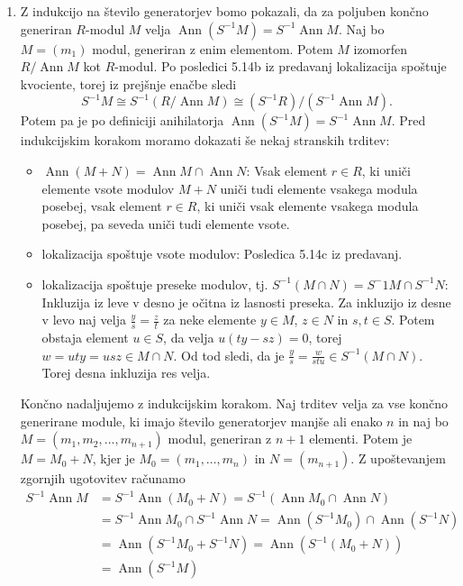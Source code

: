 \documentclass[a4paper, 12pt]{article}
\DeclareMathOperator{\Ann}{Ann}
\begin{document}
\begin{enumerate}[label=(\alph*)]
	\item Z indukcijo na število generatorjev bomo pokazali, da za poljuben končno generiran $R$-modul $M$ velja $\Ann(S^{-1}M) = S^{-1}\Ann M$.
	Naj bo $M = (m_1)$ modul, generiran z enim elementom. Potem $M$ izomorfen $R/\Ann M$ kot $R$-modul. Po posledici 5.14b iz predavanj lokalizacija spoštuje kvociente, torej iz prejšnje enačbe sledi
	\[
	S^{-1}M \cong S^{-1}\left( R/\Ann M \right) \cong (S^{-1}R)/(S^{-1}\Ann M). 
	\]
	Potem pa je po definiciji anihilatorja $\Ann(S^{-1}M) = S^{-1}\Ann M$.
	Pred indukcijskim korakom moramo dokazati še nekaj stranskih trditev:
	\begin{itemize}
		\item $\Ann (M + N) = \Ann M \cap \Ann N$: Vsak element $r \in R$, ki uniči elemente vsote modulov $M + N$ uniči tudi elemente vsakega modula posebej, vsak element $r \in R$, ki uniči vsak elemente vsakega modula posebej, pa seveda uniči tudi elemente vsote.
		\item lokalizacija spoštuje vsote modulov: Posledica 5.14c iz predavanj.
		\item lokalizacija spoštuje preseke modulov, tj. $S^{-1}(M \cap N) = S^-1M \cap S^{-1}N$: Inkluzija iz leve v desno je očitna iz lasnosti preseka. Za inkluzijo iz desne v levo naj velja $\frac{y}{s} = \frac{z}{t}$ za neke elemente $y \in M$, $z \in N$ in $s, t \in S$. Potem obstaja element $u \in S$, da velja $u(ty - sz) = 0$, torej $w = uty = usz \in M \cap N$. Od tod sledi, da je $\frac{y}{s} = \frac{w}{stu} \in S^{-1}(M \cap N)$. Torej desna inkluzija res velja.
	\end{itemize}
	Končno nadaljujemo z indukcijskim korakom. Naj trditev velja za vse končno generirane module, ki imajo število generatorjev manjše ali enako $n$ in naj bo $M = (m_1, m_2, \dots, m_{n+1})$ modul, generiran z $n+1$ elementi. Potem je $M = M_0 + N$, kjer je $M_0 = (m_1, \dots, m_n)$ in $N = (m_{n+1})$. Z upoštevanjem zgornjih ugotovitev računamo
	\begin{align*}
		S^{-1}\Ann M &= S^{-1}\Ann (M_0 + N) = S^{-1}(\Ann M_0 \cap \Ann N) \\
		&= S^{-1}\Ann M_0 \cap S^{-1}\Ann N = \Ann(S^{-1}M_0) \cap \Ann(S^{-1}N) \\
		&= \Ann(S^{-1}M_0 + S^{-1}N) = \Ann(S^{-1}(M_0 + N))\\
		&= \Ann(S^{-1}M)
	\end{align*}
\end{enumerate}
\end{document}
